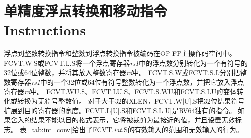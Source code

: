 \section{单精度浮点转换和移动指令\mbox{Instructions}}

浮点到整数转换指令和整数到浮点转换指令被编码在OP-FP主操作码空间中。
FCVT.W.S或FCVT.L.S将一个浮点寄存器{\em rs1}中的浮点数分别转化为一个有符号的32位或64位整数，并将其放入整数寄存器{\em rd}中。
FCVT.S.W或FCVT.S.L分别把整数寄存器{\em rs1}中的一个32位或64位有符号整数转化为一个浮点数，并把它放入浮点寄存器{\em rd}中。
FCVT.WU.S、FCVT.LU.S、FCVT.S.WU和FCVT.S.LU的变体转化或转换为无符号整数值。
对于大于32的XLEN，FCVT.W[U].S把32位结果符号扩展到目的寄存器的宽度。FCVT.L[U].S和FCVT.S.L[U]是RV64独有的指令。
如果舍入的结果不能以目的格式表示，它将被裁剪为最接近的值，并且设置无效标志。
表~\ref{tab:int_conv}给出了FCVT.{\em int}.S的有效输入的范围和无效输入的行为。


